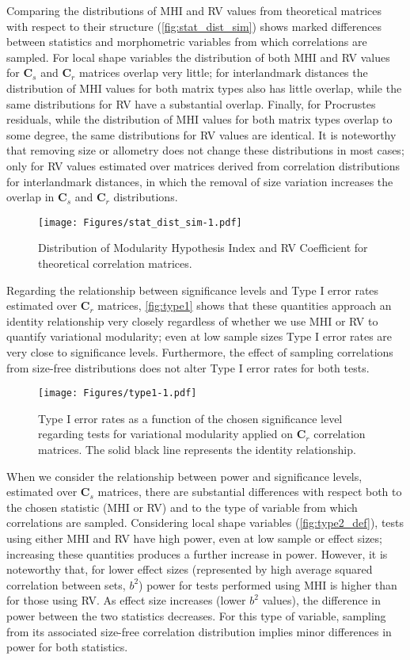 \documentclass[12pt,]{article}
\begin{document}
Comparing the distributions of MHI and RV values from theoretical
matrices with respect to their structure (\autoref{fig:stat_dist_sim})
shows marked differences between statistics and morphometric variables
from which correlations are sampled. For local shape variables the
distribution of both MHI and RV values for $\mathbf{C}_s$ and
$\mathbf{C}_r$ matrices overlap very little; for interlandmark distances
the distribution of MHI values for both matrix types also has little
overlap, while the same distributions for RV have a substantial overlap.
Finally, for Procrustes residuals, while the distribution of MHI values
for both matrix types overlap to some degree, the same distributions for
RV values are identical. It is noteworthy that removing size or
allometry does not change these distributions in most cases; only for RV
values estimated over matrices derived from correlation distributions
for interlandmark distances, in which the removal of size variation
increases the overlap in $\mathbf{C}_s$ and $\mathbf{C}_r$
distributions.

\begin{figure}[htbp]
\centering
\texttt{[image: Figures/stat\_dist\_sim-1.pdf]}
\caption{Distribution of Modularity Hypothesis Index and RV Coefficient
for theoretical correlation matrices. \label{fig:stat_dist_sim}}
\end{figure}

Regarding the relationship between significance levels and Type I error
rates estimated over $\mathbf{C}_r$ matrices, \autoref{fig:type1} shows
that these quantities approach an identity relationship very closely
regardless of whether we use MHI or RV to quantify variational
modularity; even at low sample sizes Type I error rates are very close
to significance levels. Furthermore, the effect of sampling correlations
from size-free distributions does not alter Type I error rates for both
tests.

\begin{figure}[htbp]
\centering
\texttt{[image: Figures/type1-1.pdf]}
\caption{Type I error rates as a function of the chosen significance
level regarding tests for variational modularity applied on
$\mathbf{C}_r$ correlation matrices. The solid black line represents the
identity relationship. \label{fig:type1}}
\end{figure}

When we consider the relationship between power and significance levels,
estimated over $\mathbf{C}_s$ matrices, there are substantial
differences with respect both to the chosen statistic (MHI or RV) and to
the type of variable from which correlations are sampled. Considering
local shape variables (\autoref{fig:type2_def}), tests using either MHI
and RV have high power, even at low sample or effect sizes; increasing
these quantities produces a further increase in power. However, it is
noteworthy that, for lower effect sizes (represented by high average
squared correlation between sets, $b^2$) power for tests performed using
MHI is higher than for those using RV. As effect size increases (lower
$b^2$ values), the difference in power between the two statistics
decreases. For this type of variable, sampling from its associated
size-free correlation distribution implies minor differences in power
for both statistics.
\end{document}
